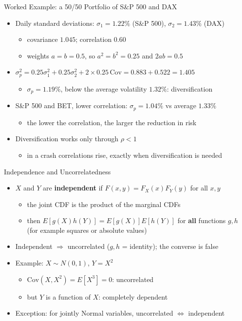 \begin{frame}{Worked Example: a 50/50 Portfolio of S\&P 500 and DAX}
\itemsize{\footnotesize}
\begin{itemize}
    \item Daily standard deviations: $\sigma_1 = 1.22\%$ (S\&P 500), $\sigma_2 = 1.43\%$ (DAX)
    \begin{itemize}
        \item covariance $1.045$; correlation $0.60$
        \item weights $a = b = 0.5$, so $a^2 = b^2 = 0.25$ and $2ab = 0.5$
    \end{itemize}
    \item $\sigma_p^2 = 0.25\sigma_1^2 + 0.25\sigma_2^2 + 2 \times 0.25\,\text{Cov} = 0.883 + 0.522 = 1.405$
    \begin{itemize}
        \item $\sigma_p = 1.19\%$, below the average volatility $1.32\%$: diversification
    \end{itemize}
    \item S\&P 500 and BET, lower correlation: $\sigma_p = 1.04\%$ vs average $1.33\%$
    \begin{itemize}
        \item the lower the correlation, the larger the reduction in risk
    \end{itemize}
    \item Diversification works only through $\rho < 1$
    \begin{itemize}
        \item in a crash correlations rise, exactly when diversification is needed
    \end{itemize}
\end{itemize}
\end{frame}

\begin{frame}{Independence and Uncorrelatedness}
\itemsize{\small}
\begin{itemize}
    \item $X$ and $Y$ are \textbf{independent} if $F(x, y) = F_X(x)F_Y(y)$ for all $x, y$
    \begin{itemize}
        \item the joint CDF is the product of the marginal CDFs
        \item then $E[g(X)h(Y)] = E[g(X)]E[h(Y)]$ for \textbf{all} functions $g, h$ (for example squares or absolute values)
    \end{itemize}
    \item Independent $\Rightarrow$ uncorrelated ($g, h$ = identity); the converse is false
    \item Example: $X \sim N(0, 1)$, $Y = X^2$
    \begin{itemize}
        \item $\text{Cov}(X, X^2) = E[X^3] = 0$: uncorrelated
        \item but $Y$ is a function of $X$: completely dependent
    \end{itemize}
    \item Exception: for jointly Normal variables, uncorrelated $\Leftrightarrow$ independent
\end{itemize}
\end{frame}

